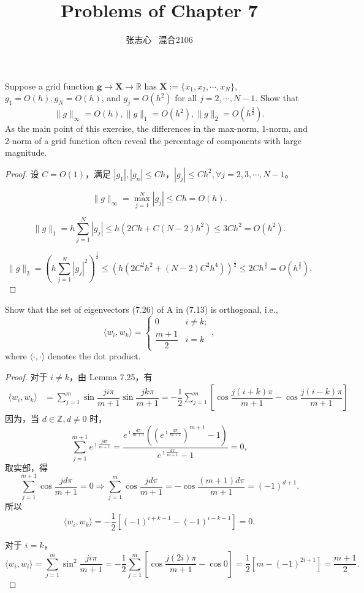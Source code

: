 \documentclass[lang=cn,a4paper,newtx,bibend=bibtex]{elegantpaper}
\title{Problems of Chapter 7}
\author{张志心 \ 混合2106}
\date{\zhdate{2023/12/28}}
\newcommand{\XB}{\bm{X}}
\newcommand{\gB}{\bm{g}}
\newcommand{\RBB}{\mathbb{R}}
\newcommand{\indot}[2]{\langle {#1}, {#2} \rangle}
\begin{document}
\maketitle

\begin{prob}[Exercise 7.14]
  Suppose a grid function $\gB \to \XB \to \RBB$ has $\XB:= \{x_1, x_2, \cdots, x_N\}$,
  $g_1 = O(h), g_N = O(h)$, and $g_j = O(h^2)$ for all $j = 2, \cdots, N - 1$. Show that
  \[\| g\|_{\infty} = O(h), \|g\|_1 = O(h^2), \|g\|_2 = O(h^{\frac32}).\]
  As the main point of this exercise, the differences in the max-norm, 1-norm, 
  and 2-norm of a grid function often reveal the percentage of components
  with large magnitude.
\end{prob}

\begin{proof}
设 $C = O(1)$，满足 $|g_1|, |g_n| \le Ch$，$|g_j| \le Ch^2, \forall j = 2, 3, \cdots, N-1$。

\[ \| g\|_{\infty} = \max_{j = 1}^N |g_j| \le Ch = O(h).\]

\[\|g\|_1 = h \sum_{j = 1}^N |g_j| \le h (2Ch + C(N-2)h^2) \le 3Ch^2 = O(h^2).\]

\[\|g\|_2 = (h\sum_{j=1}^N|g_j|^2)^{\frac12} \le (h(2C^2h^2 + (N-2)C^2h^4))^{\frac12} \le 2Ch^{\frac32} = O(h^{\frac32}).\]

\end{proof}

\begin{prob}[Exercise 7.26]
  Show that the set of eigenvectors (7.26) of A in (7.13) is orthogonal, i.e.,
  \[\indot{w_i}{w_k} = \begin{cases} 0 & i \neq k; \\ \dfrac{m+1}2 & i = k\end{cases},\]
  where $\indot{\cdot}{\cdot}$ denotes the dot product.
\end{prob}

\begin{proof}
  对于 $i \neq k$，由 Lemma 7.25，有
  \begin{equation*}
  \begin{aligned}
    \indot{w_i}{w_k} &= \sum_{j = 1}^m \sin \dfrac{ji\pi}{m+1} \sin \dfrac{jk\pi}{m+1} = -\dfrac12 \sum_{j = 1}^m \left[\cos \dfrac{j(i+k)\pi}{m+1} - \cos \dfrac{j(i -k)\pi}{m+1}\right]
  \end{aligned}
  \end{equation*}
  因为，当 $d\in \mathbb{Z}, d\neq 0$ 时，
  \[\sum_{j =1}^{m+1} e^{\imath\frac{jd\pi}{m+1}} = \dfrac{e^{\imath\frac{d\pi}{m+1}} \left(\left(e^{\imath\frac{d\pi}{m+1}}\right)^{m+1} - 1\right)}{e^{\imath\frac{d\pi}{m+1}} - 1} = 0,\]
  取实部，得
  \[\sum_{j=1}^{m+1} \cos \dfrac{jd\pi}{m+1} = 0 \Rightarrow \sum_{j = 1}^m \cos \dfrac{jd\pi}{m+1} = - \cos \dfrac{(m+1)d\pi}{m+1} = (-1)^{d+1}.\]
  所以
  \[\indot{w_i}{w_k} = -\dfrac12 [(-1)^{i+k-1} - (-1)^{i-k-1}] = 0.\]

  对于 $i = k$，
  \[\indot{w_i}{w_i} = \sum_{j = 1}^{m} \sin^2 \dfrac{ji\pi}{m+1} = -\dfrac12 \sum_{j = 1}^m \left[\cos \dfrac{j(2i)\pi}{m+1} - \cos 0 \right]= \frac12 [m - (-1)^{2i+1}] = \dfrac{m + 1}{2}. \]

\end{proof}
\end{document}
